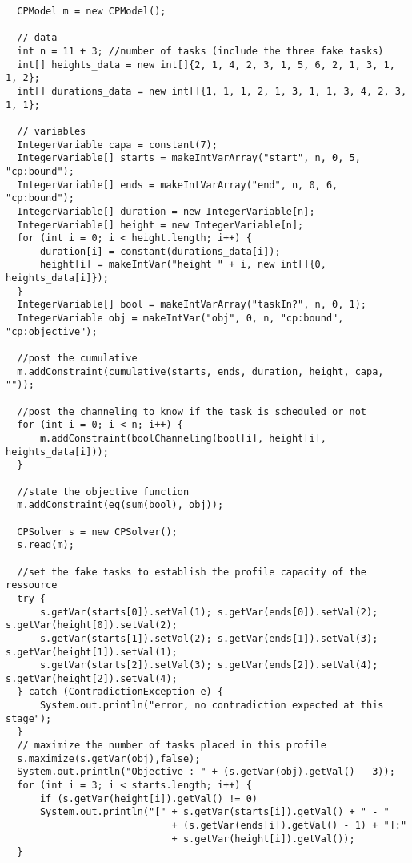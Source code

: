 \begin{lstlisting}
  CPModel m = new CPModel();
	
  // data
  int n = 11 + 3; //number of tasks (include the three fake tasks)
  int[] heights_data = new int[]{2, 1, 4, 2, 3, 1, 5, 6, 2, 1, 3, 1, 1, 2};
  int[] durations_data = new int[]{1, 1, 1, 2, 1, 3, 1, 1, 3, 4, 2, 3, 1, 1};

  // variables
  IntegerVariable capa = constant(7);
  IntegerVariable[] starts = makeIntVarArray("start", n, 0, 5, "cp:bound");
  IntegerVariable[] ends = makeIntVarArray("end", n, 0, 6, "cp:bound");
  IntegerVariable[] duration = new IntegerVariable[n];
  IntegerVariable[] height = new IntegerVariable[n];
  for (int i = 0; i < height.length; i++) {
      duration[i] = constant(durations_data[i]);
      height[i] = makeIntVar("height " + i, new int[]{0, heights_data[i]});
  }
  IntegerVariable[] bool = makeIntVarArray("taskIn?", n, 0, 1);
  IntegerVariable obj = makeIntVar("obj", 0, n, "cp:bound", "cp:objective");
	
  //post the cumulative
  m.addConstraint(cumulative(starts, ends, duration, height, capa, ""));
	
  //post the channeling to know if the task is scheduled or not
  for (int i = 0; i < n; i++) {
      m.addConstraint(boolChanneling(bool[i], height[i], heights_data[i]));
  }

  //state the objective function
  m.addConstraint(eq(sum(bool), obj));
	
  CPSolver s = new CPSolver();
  s.read(m);
	
  //set the fake tasks to establish the profile capacity of the ressource
  try {
      s.getVar(starts[0]).setVal(1); s.getVar(ends[0]).setVal(2); s.getVar(height[0]).setVal(2);
      s.getVar(starts[1]).setVal(2); s.getVar(ends[1]).setVal(3); s.getVar(height[1]).setVal(1); 
      s.getVar(starts[2]).setVal(3); s.getVar(ends[2]).setVal(4); s.getVar(height[2]).setVal(4);
  } catch (ContradictionException e) {
      System.out.println("error, no contradiction expected at this stage");
  }
  // maximize the number of tasks placed in this profile	
  s.maximize(s.getVar(obj),false);
  System.out.println("Objective : " + (s.getVar(obj).getVal() - 3));
  for (int i = 3; i < starts.length; i++) {
      if (s.getVar(height[i]).getVal() != 0)
      System.out.println("[" + s.getVar(starts[i]).getVal() + " - " 
                             + (s.getVar(ends[i]).getVal() - 1) + "]:"
                             + s.getVar(height[i]).getVal());
  }
\end{lstlisting} 
